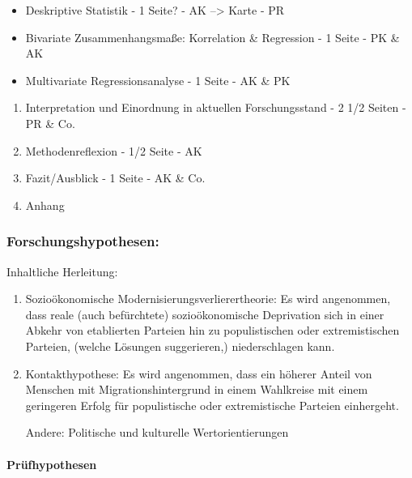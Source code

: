 \documentclass[11pt]{article}
\providecommand{\tightlist}{%
      \setlength{\itemsep}{0pt}\setlength{\parskip}{0pt}}
\begin{document}
\begin{itemize}
\tightlist
\item
  Deskriptive Statistik - 1 Seite? - AK --\textgreater{} Karte - PR
\item
  Bivariate Zusammenhangsmaße: Korrelation \& Regression - 1 Seite - PK
  \& AK
\item
  Multivariate Regressionsanalyse - 1 Seite - AK \& PK
\end{itemize}

\begin{enumerate}
\def\labelenumi{\arabic{enumi}.}
\setcounter{enumi}{7}
\item
  Interpretation und Einordnung in aktuellen Forschungsstand - 2 1/2
  Seiten - PR \& Co.
\item
  Methodenreflexion - 1/2 Seite - AK
\item
  Fazit/Ausblick - 1 Seite - AK \& Co.
\item
  Anhang
\end{enumerate}

    \hypertarget{forschungshypothesen}{%
\subsubsection{Forschungshypothesen:}\label{forschungshypothesen}}

Inhaltliche Herleitung:

\begin{enumerate}
\def\labelenumi{\arabic{enumi}.}
\item
  Sozioökonomische Modernisierungsverlierertheorie: Es wird angenommen,
  dass reale (auch befürchtete) sozioökonomische Deprivation sich in
  einer Abkehr von etablierten Parteien hin zu populistischen oder
  extremistischen Parteien, (welche Lösungen suggerieren,)
  niederschlagen kann.
\item
  Kontakthypothese: Es wird angenommen, dass ein höherer Anteil von
  Menschen mit Migrationshintergrund in einem Wahlkreise mit einem
  geringeren Erfolg für populistische oder extremistische Parteien
  einhergeht.

  Andere: Politische und kulturelle Wertorientierungen
\end{enumerate}

    \hypertarget{pruxfcfhypothesen}{%
\paragraph{Prüfhypothesen}\label{pruxfcfhypothesen}}
\end{document}
